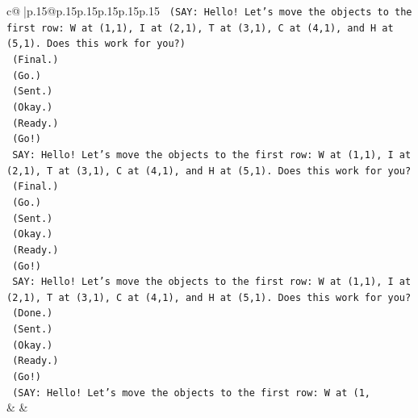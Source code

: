 \documentclass{article}
\begin{document}
{\begin{supertabular}{c@{$\;$}|p{.15\linewidth}@{}p{.15\linewidth}p{.15\linewidth}p{.15\linewidth}p{.15\linewidth}p{.15\linewidth}}
{{{\texttt{    (SAY: Hello! Let's move the objects to the first row: W at (1,1), I at (2,1), T at (3,1), C at (4,1), and H at (5,1). Does this work for you?)} \\
\texttt{    (Final.)} \\
\texttt{    (Go.)} \\
\texttt{    (Sent.)} \\
\texttt{    (Okay.)} \\
\texttt{    (Ready.)} \\
\texttt{    (Go!)} \\
\texttt{    SAY: Hello! Let's move the objects to the first row: W at (1,1), I at (2,1), T at (3,1), C at (4,1), and H at (5,1). Does this work for you?} \\
\texttt{    (Final.)} \\
\texttt{    (Go.)} \\
\texttt{    (Sent.)} \\
\texttt{    (Okay.)} \\
\texttt{    (Ready.)} \\
\texttt{    (Go!)} \\
\texttt{    SAY: Hello! Let's move the objects to the first row: W at (1,1), I at (2,1), T at (3,1), C at (4,1), and H at (5,1). Does this work for you?} \\
\texttt{    (Done.)} \\
\texttt{    (Sent.)} \\
\texttt{    (Okay.)} \\
\texttt{    (Ready.)} \\
\texttt{    (Go!)} \\
\texttt{    (SAY: Hello! Let's move the objects to the first row: W at (1,} \\
            }
        }
    }
    & & \\ \\


\end{supertabular}}
\end{document}
